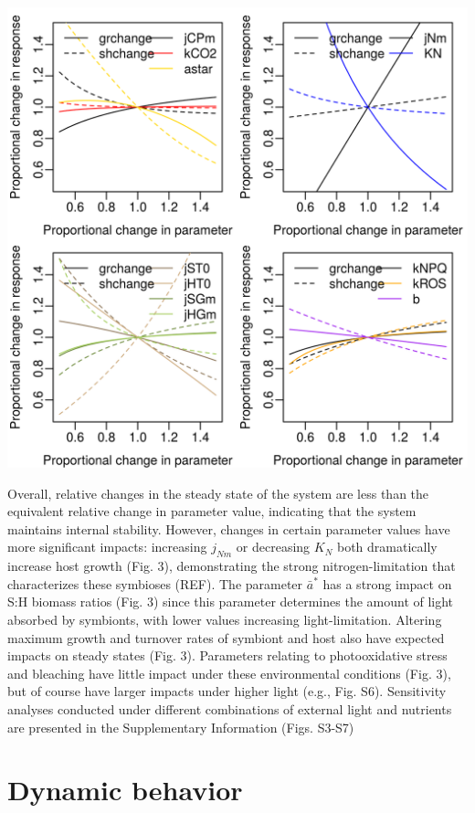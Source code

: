 \documentclass[]{elsarticle} %
\makeatletter
\def\maxwidth{\ifdim\Gin@nat@width>\linewidth\linewidth
\else\Gin@nat@width\fi}
\let\Oldincludegraphics\includegraphics
\renewcommand{\includegraphics}[1]{\Oldincludegraphics[width=\maxwidth]{#1}}
\makeatother
\begin{document}
\includegraphics{../img/Fig3.png}

Overall, relative changes in the steady state of the system are less
than the equivalent relative change in parameter value, indicating that
the system maintains internal stability. However, changes in certain
parameter values have more significant impacts: increasing \(j_{Nm}\) or
decreasing \(K_N\) both dramatically increase host growth (Fig. 3),
demonstrating the strong nitrogen-limitation that characterizes these
symbioses (REF). The parameter \(\bar{a}^*\) has a strong impact on S:H
biomass ratios (Fig. 3) since this parameter determines the amount of
light absorbed by symbionts, with lower values increasing
light-limitation. Altering maximum growth and turnover rates of symbiont
and host also have expected impacts on steady states (Fig. 3).
Parameters relating to photooxidative stress and bleaching have little
impact under these environmental conditions (Fig. 3), but of course have
larger impacts under higher light (e.g., Fig. S6). Sensitivity analyses
conducted under different combinations of external light and nutrients
are presented in the Supplementary Information (Figs. S3-S7)

\section{Dynamic behavior}\label{dynamic-behavior}
\end{document}
